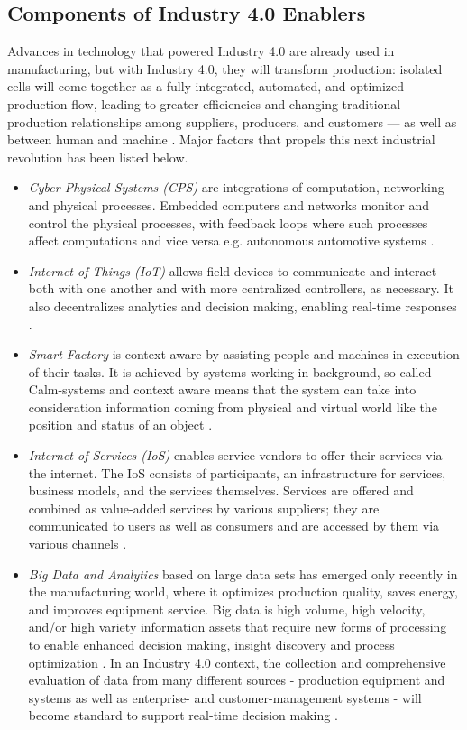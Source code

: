 \subsection{Components of Industry 4.0 Enablers}
Advances in technology that powered Industry 4.0 are already used in manufacturing, but with Industry 4.0, they will transform production: isolated cells will come together as a fully integrated, automated, and optimized production flow, leading to greater efficiencies and changing traditional production relationships among suppliers, producers, and customers — as well as between human and machine \cite{IN4BCG}. Major factors that propels this next industrial revolution has been listed below.
\begin{itemize}
	\item \textit{Cyber Physical Systems (CPS)} are integrations of computation, networking and physical processes. Embedded computers and networks monitor and control the physical processes, with feedback loops where such processes affect computations and vice versa e.g. autonomous automotive systems \cite{IN4DESIGN}.
	\item \textit{Internet of Things (IoT)} allows field devices to communicate and interact both with one another and with more centralized controllers, as necessary. It also decentralizes analytics and decision making, enabling real-time responses \cite{IN4BCG,IN4DESIGN}.
	\item \textit{Smart Factory} is context-aware by assisting people and machines in execution of their tasks. It is achieved by systems working in background, so-called Calm-systems and context aware means that the system can take into consideration information coming 	from physical and virtual world like the position and status of an object \cite{IN4DESIGN}.
	\item \textit{Internet of Services (IoS)} enables service vendors to offer their services via the internet. The IoS consists of participants, an infrastructure for services, business models, and the services themselves. Services are offered and combined as value-added services by various suppliers; they are communicated to users as well as consumers and are accessed by them via various channels \cite{IN4DESIGN}.
	\item \textit{Big Data and Analytics} based on large data sets has emerged only recently in the manufacturing world, where it optimizes production quality, saves energy, and improves equipment service. Big data is high volume, high velocity, and/or high variety information assets that require new forms of processing to enable enhanced decision making, insight discovery and process optimization \cite{BIGDATA}. In an Industry 4.0 context, the collection and comprehensive evaluation of data from many different sources - production equipment and systems as well as enterprise- and customer-management systems - will become standard to support real-time decision making \cite{IN4BCG,IN4DESIGN}.

\end{itemize}
